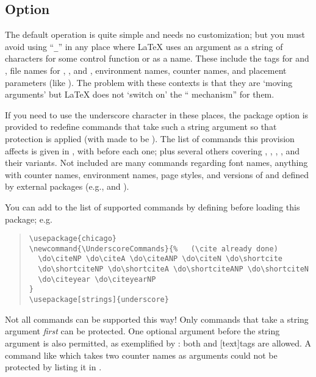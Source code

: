 \documentclass[a4paper]{article}
\begin{document}
\subsection*{Option \protect\option[strings]}

The default operation is quite simple and needs no customization; but
you must avoid using ``\texttt{_}'' in any place where LaTeX uses an argument
as a string of characters for some control function or as a name.
These include the tags for  and , file names for , 
, and , environment names, counter names,
and placement parameters (like \option[t]).  The problem with these contexts
is that they are `moving arguments' but LaTeX does not `switch on' the
`` mechanism'' for them.

If you need to use the underscore character in these places, the
package option \option[strings] is provided to redefine commands that
take such a string argument so that protection is applied (with
 made to be ).  The list of commands this
provision affects is given in , with 
before each one; plus several others covering ,
, , , and their variants.  Not
included are many commands regarding font names, anything with counter
names, environment names, page styles, and versions of  and
 defined by external packages (e.g.,  and
).

You can add to the list of supported commands by defining 
before loading this package; e.g.
\begin{quote}
\begin{verbatim}
\usepackage{chicago}
\newcommand{\UnderscoreCommands}{%   (\cite already done)
  \do\citeNP \do\citeA \do\citeANP \do\citeN \do\shortcite
  \do\shortciteNP \do\shortciteA \do\shortciteANP \do\shortciteN
  \do\citeyear \do\citeyearNP
}
\usepackage[strings]{underscore}
\end{verbatim}
\end{quote}

Not all commands can be supported this way!  Only commands that take a
string argument \emph{first} can be protected.  One optional argument before
the string argument is also permitted, as exemplified by : both
 and [text]{tags} are allowed.
A command like  which takes two counter names as
arguments could not be protected by listing it in .
\end{document}
